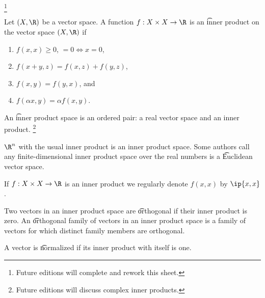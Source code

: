 
  \ifhmode\unskip\fi\footnote{
Future editions will complete and rework this sheet.
  }


Let $(X, \R )$ be a vector space.
A function $f: X \times  X \to \R $ is an \t{inner product} on the vector space $(X, \R )$ if
  \begin{enumerate}
  \item $f(x,x) \geq 0$, $= 0 \iff x = 0$,
  \item $f(x+y,z) = f(x,z) + f(y, z)$,
  \item $f(x,y) = f(y,x)$, and
  \item $f(\alpha  x,y) = \alpha  f(x,y)$.
  \end{enumerate}
An \t{inner product space} is an ordered pair: a real vector space and an inner product.
  \ifhmode\unskip\fi\footnote{
Future editions will discuss complex inner products.
  }


$\R ^n$ with the usual inner product is an inner product space.
Some authors call any finite-dimensional inner product space over the real numbers is a \t{Euclidean vector space}.


If $f: X \times  X \to \R $ is an inner product we regularly denote $f(x, x)$ by $\ip{x,x}$.


Two vectors in an inner product space are \t{orthogonal} if their inner product is zero.
An \t{orthogonal family of vectors} in an inner product space is a family of vectors for which distinct family members are orthogonal.

A vector is \t{normalized} if its inner product with itself is one.

\blankpage
